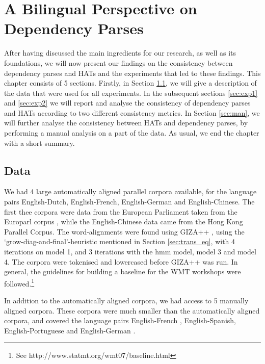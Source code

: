 %
%

\chapter{A Bilingual Perspective on Dependency Parses}
\label{chap:exp}

After having discussed the main ingredients for our research, as well as its foundations, we will now present our findings on the consistency between dependency parses and HATs and the experiments that led to these findings. This chapter consists of 5 sections. Firstly, in Section \ref{sec:data}, we will give a description of the data that were used for all experiments. In the subsequent sections \ref{sec:exp1} and \ref{sec:exp2} we will report and analyse the consistency of dependency parses and HATs according to two different consistency metrics. In Section \ref{sec:man}, we will further analyse the consistency between HATs and dependency parses, by performing a manual analysis on a part of the data. As usual, we end the chapter with a short summary.

\section{Data}
\label{sec:data}

We had 4 large automatically aligned parallel corpora available, for the language pairs English-Dutch, English-French, English-German and English-Chinese. The first thee corpora were data from the European Parliament taken from the Europarl corpus \citep{koehn2005europarl}, while the English-Chinese data came from the Hong Kong Parallel Corpus. The word-alignments were found using GIZA++ \citep{och03:asc}, using the `grow-diag-and-final'-heuristic mentioned in Section \ref{sec:trans_eq}, with 4 iterations on model 1, and 3 iterations with the hmm model, model 3 and model 4. The corpora were tokenised and lowercased before GIZA++ was run. In general, the guidelines for building a baseline for the WMT workshops were followed.\footnote{See http://www.statmt.org/wmt07/baseline.html}

In addition to the automatically aligned corpora, we had access to 5 manually aligned corpora. These corpora were much smaller than the automatically aligned corpora, and covered the language pairs English-French \citep{graca2008building,och2000improved}, English-Spanish, English-Portuguese \citep{graca2008building} and English-German \citep{pado2006optimal}.

